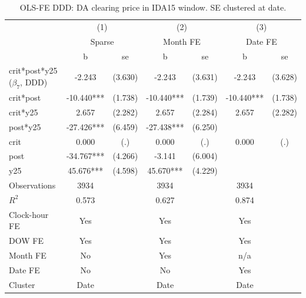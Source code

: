 \begin{table}[htbp]\centering
\def\sym#1{\ifmmode^{#1}\else\(^{#1}\)\fi}
\caption{OLS-FE DDD: DA clearing price in IDA15 window. SE clustered at date.}\label{tab:reform_ddd_ida15_da}
\begin{tabular}{l*{3}{cc}}
\toprule
                    &\multicolumn{2}{c}{(1)}     &\multicolumn{2}{c}{(2)}     &\multicolumn{2}{c}{(3)}     \\
                    &\multicolumn{2}{c}{Sparse}  &\multicolumn{2}{c}{Month FE}&\multicolumn{2}{c}{Date FE} \\
                    &           b   &          se&           b   &          se&           b   &          se\\
\midrule
crit*post*y25 ($\beta_7$, DDD)&      -2.243   &     (3.630)&      -2.243   &     (3.631)&      -2.243   &     (3.628)\\
crit*post           &     -10.440***&     (1.738)&     -10.440***&     (1.739)&     -10.440***&     (1.738)\\
crit*y25            &       2.657   &     (2.282)&       2.657   &     (2.284)&       2.657   &     (2.282)\\
post*y25            &     -27.426***&     (6.459)&     -27.438***&     (6.250)&               &            \\
crit                &       0.000   &         (.)&       0.000   &         (.)&       0.000   &         (.)\\
post                &     -34.767***&     (4.266)&      -3.141   &     (6.004)&               &            \\
y25                 &      45.676***&     (4.598)&      45.670***&     (4.229)&               &            \\
\midrule
Observations        &        3934   &            &        3934   &            &        3934   &            \\
$R^2$               &       0.573   &            &       0.627   &            &       0.874   &            \\
Clock-hour FE       &         Yes   &            &         Yes   &            &         Yes   &            \\
DOW FE              &         Yes   &            &         Yes   &            &         Yes   &            \\
Month FE            &          No   &            &         Yes   &            &         n/a   &            \\
Date FE             &          No   &            &          No   &            &         Yes   &            \\
Cluster             &        Date   &            &        Date   &            &        Date   &            \\
\bottomrule
\end{tabular}
\end{table}
